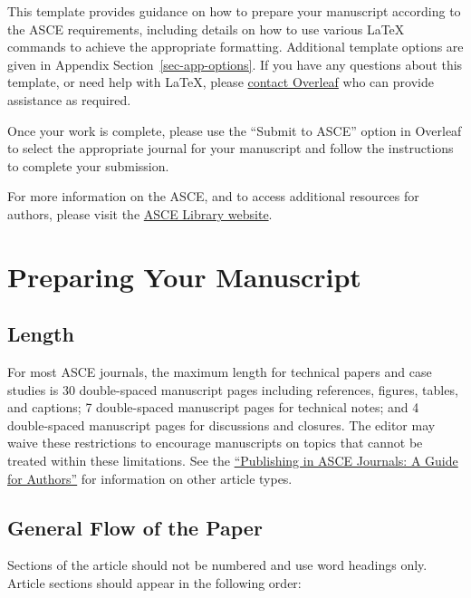 \documentclass[
  NewProceedings,
  letterpaper]{./assets/ascelike-new}
\begin{document}
This template provides guidance on how to prepare your manuscript
according to the ASCE requirements, including details on how to use
various LaTeX commands to achieve the appropriate formatting. Additional
template options are given in Appendix Section~\ref{sec-app-options}. If
you have any questions about this template, or need help with LaTeX,
please \href{https://www.overleaf.com/contact}{contact Overleaf} who can
provide assistance as required.

Once your work is complete, please use the ``Submit to ASCE'' option in
Overleaf to select the appropriate journal for your manuscript and
follow the instructions to complete your submission.

For more information on the ASCE, and to access additional resources for
authors, please visit the
\href{http://ascelibrary.org/page/authors}{ASCE Library website}.

\hypertarget{preparing-your-manuscript}{%
\section{Preparing Your Manuscript}\label{preparing-your-manuscript}}

\hypertarget{length}{%
\subsection{Length}\label{length}}

For most ASCE journals, the maximum length for technical papers and case
studies is 30 double-spaced manuscript pages including references,
figures, tables, and captions; 7 double-spaced manuscript pages for
technical notes; and 4 double-spaced manuscript pages for discussions
and closures. The editor may waive these restrictions to encourage
manuscripts on topics that cannot be treated within these limitations.
See the
\href{https://ascelibrary.org/doi/pdf/10.1061/9780784479018}{``Publishing
in ASCE Journals: A Guide for Authors''} for information on other
article types.

\hypertarget{general-flow-of-the-paper}{%
\subsection{General Flow of the Paper}\label{general-flow-of-the-paper}}

Sections of the article should not be numbered and use word headings
only. Article sections should appear in the following order:
\end{document}
